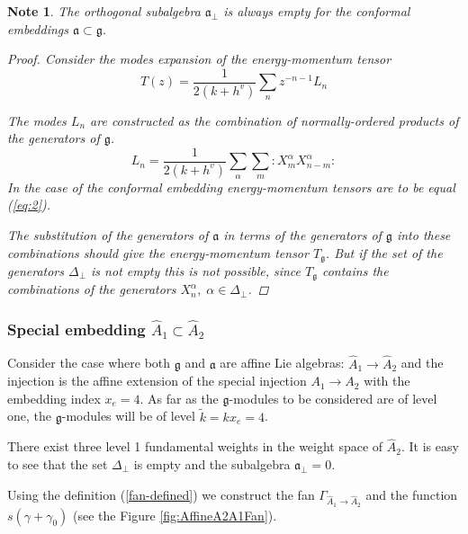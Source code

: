 \documentclass[12pt]{iopart}
\newtheorem{mynote}{Note}[section]
\begin{document}
\begin{mynote} The orthogonal subalgebra $\mathfrak{a}_{\bot}$ is always empty for the conformal embeddings $\mathfrak{a}\subset \mathfrak{g}$.
\begin{proof} 
Consider the modes expansion of the energy-momentum tensor
\begin{equation}
\label{eq:47}
  T(z)=\frac{1}{2(k+h^v)}\sum_n z^{-n-1}L_n
\end{equation}

The modes $L_n$ are constructed as the combination of normally-ordered products of the generators of $\mathfrak{g}$.
\begin{equation}
\label{eq:48}
  L_n=\frac{1}{2(k+h^v)}\sum_{\alpha}\sum_m:X^{\alpha}_m X^{\alpha}_{n-m}:
\end{equation}
In the case of the conformal embedding energy-momentum tensors are to be equal (\ref{eq:2}).

The substitution of the generators of $\mathfrak{a}$  in terms of the generators of $\mathfrak{g}$ into these combinations  should give the energy-momentum tensor $T_{\mathfrak{g}}$. But if the set of the generators $\Delta_{\bot}$ is not empty this is not possible, since $T_{\mathfrak{g}}$ contains the combinations of the generators $X^{\alpha}_n, \; \alpha\in \Delta_{\bot}$.
\end{proof}
\end{mynote}
\subsubsection{Special embedding $\hat{A}_1\subset\hat{A}_2$}
\label{sec:spec-embedd-hata_1s}
Consider the case where both $\mathfrak{g}$ and $\mathfrak{a}$ are affine Lie algebras:
$\hat{A}_1 \longrightarrow \hat{A}_2$ and the injection is the affine extension of the
special injection $A_1 \longrightarrow A_2$ with the embedding index $x_e=4$.
As far as the $\mathfrak{g}$-modules to be considered are of level one,
the $\mathfrak{g}$-modules will be of level $\tilde{k}=kx_e=4$.

There exist three level 1 fundamental weights in the weight space of $\hat{A}_2$.
It is easy to see that the set $\Delta_{\bot}$ is empty and the subalgebra $\mathfrak{a}_{\bot}=0$.

Using the definition (\ref{fan-defined})  we construct the fan $\Gamma_{\hat A_1\to\hat A_2}$
and the function $s(\gamma+\gamma_0)$ (see the Figure \ref{fig:AffineA2A1Fan}).
\end{document}

